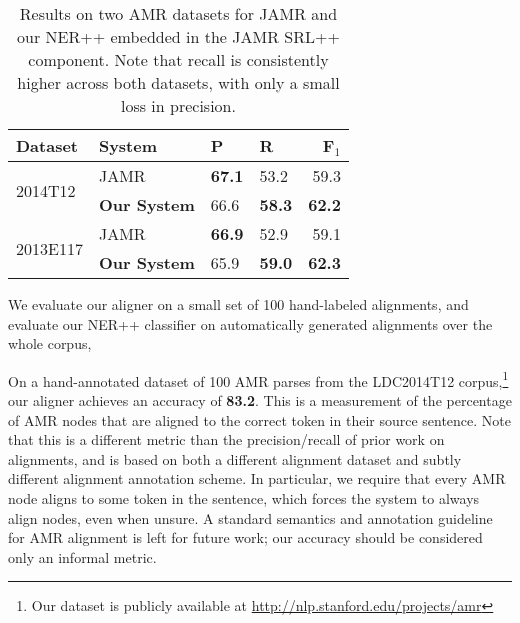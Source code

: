 \documentclass[11pt]{article}
\begin{document}

\begin{table}[t]
\begin{center}
\begin{tabular}{l|l|llr}
\textbf{Dataset} &  \textbf{System} & \textbf{P} & \textbf{R} & \textbf{F$_1$} \\
\hline
\multirow{2}{*}{2014T12} & JAMR & \textbf{67.1} & 53.2 & 59.3 \\
  & \textbf{Our System} & 66.6 & \textbf{58.3} & \textbf{62.2} \\
\hline
\multirow{2}{*}{2013E117} & JAMR & \textbf{66.9} & 52.9 & 59.1 \\
  & \textbf{Our System} & 65.9 & \textbf{59.0} & \textbf{62.3} \\
\end{tabular}
\end{center}
\caption{\label{tab:results} 
Results on two AMR datasets for JAMR and our NER++ embedded in the JAMR SRL++
  component.
Note that recall is consistently higher across both datasets, with only a small
  loss in precision.
}
\end{table}

We evaluate our aligner on a small set of 100 hand-labeled alignments,
  and evaluate our NER++ classifier on automatically generated alignments over the whole corpus,
  
On a hand-annotated dataset of 100 AMR parses from the LDC2014T12 corpus,\footnote{
    Our dataset is publicly available at \url{http://nlp.stanford.edu/projects/amr}
  }
  our aligner achieves
  an accuracy of \textbf{83.2}.
This is a measurement of the percentage of AMR nodes that are
  aligned to the correct token in their source sentence.
Note that this is a different metric than the precision/recall of prior work on alignments, and
  is based on both a different alignment dataset and subtly different alignment annotation scheme.
In particular, we require that every AMR node aligns to some token in the sentence,
  which forces the system to always align nodes, even when unsure.
A standard semantics and annotation guideline for AMR alignment is left for 
  future work; our accuracy should be considered only an informal metric.
\end{document}
